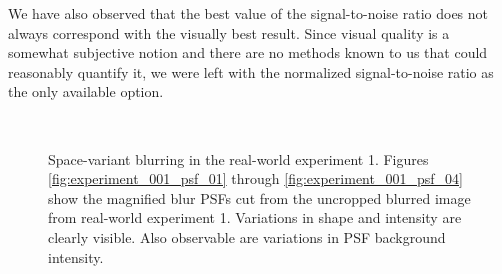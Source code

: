 \documentclass[12pt,notitlepage]{report}
\begin{document}
We have also observed that the best value of the signal-to-noise ratio does not always correspond with the visually best result. Since visual quality is a somewhat subjective notion and there are no methods known to us that could reasonably quantify it, we were left with the normalized signal-to-noise ratio as the only available option.   

\begin{figure}[h]
  \centering
	  ~
	  ~
	  ~
  \caption[Space-variant blurring in the real-world experiment 1]{Space-variant blurring in the real-world experiment 1. Figures \ref{fig:experiment_001_psf_01} through \ref{fig:experiment_001_psf_04} show the magnified blur PSFs cut from the uncropped blurred image from real-world experiment 1. Variations in shape and intensity are clearly visible. Also observable are variations in PSF background intensity.}
  \label{fig:experiment_001_psf_variations}
\end{figure}
\end{document}
